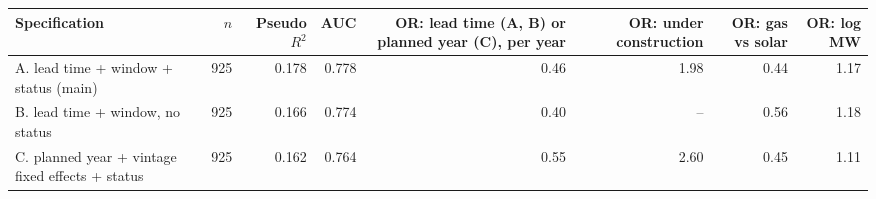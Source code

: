 \begin{tabular}{p{6.2cm}rrrrrrr}
\toprule
Specification & $n$ & Pseudo $R^2$ & AUC & OR: lead time (A, B) or planned year (C), per year & OR: under construction & OR: gas vs solar & OR: log MW \\
\midrule
A. lead time + window + status (main) & 925 & 0.178 & 0.778 & 0.46 & 1.98 & 0.44 & 1.17 \\
B. lead time + window, no status & 925 & 0.166 & 0.774 & 0.40 & -- & 0.56 & 1.18 \\
C. planned year + vintage fixed effects + status & 925 & 0.162 & 0.764 & 0.55 & 2.60 & 0.45 & 1.11 \\
\bottomrule
\end{tabular}
